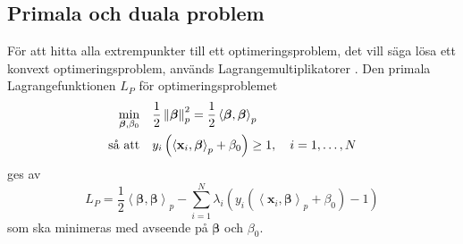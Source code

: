 \documentclass[a4paper, 12pt]{report}
\theoremstyle{definition}
\theoremstyle{remark}
\newcommand{\bfbeta}{{\boldsymbol{\beta}}}
\newcommand{\bfx}{\mathbf{x}}
\newcommand{\llangle}{\left\langle}
\newcommand{\rrangle}{\right\rangle}
\newcommand{\inner}[2]{\llangle #1, #2 \rrangle}
\begin{document}
\subsection{Primala och duala problem}

För att hitta alla extrempunkter till ett optimeringsproblem, det vill säga lösa ett konvext optimeringsproblem, används Lagrangemultiplikatorer \cite{Boyd}. %
Den primala Lagrangefunktionen $L_P$ för optimeringsproblemet
\begin{equation*}
\begin{aligned}
\operatornamewithlimits{min}_{\bfbeta,\beta_0} & & &\frac{1}{2}\left\|\bfbeta
\right\|_p^2=\frac{1}{2}\inner{\bfbeta}{\bfbeta}_p\\
\text{så att} & & &y_i\left(\inner{\bfx_i}{\bfbeta}_p+\beta_0\right)\geq 1,\quad i=1,\dots,N
\end{aligned}
\end{equation*}
ges av
\begin{equation}\label{eq:primallagrange}
L_P=\frac{1}{2}\inner{\bfbeta}{\bfbeta}_p - \sum_{i=1}^{N} \lambda_i\left(y_i \left(\inner{\bfx_i}{\bfbeta}_p + \beta_0\right)-1\right)
\end{equation}
som ska minimeras med avseende på $\bfbeta$ och $\beta_0$. %
\end{document}

